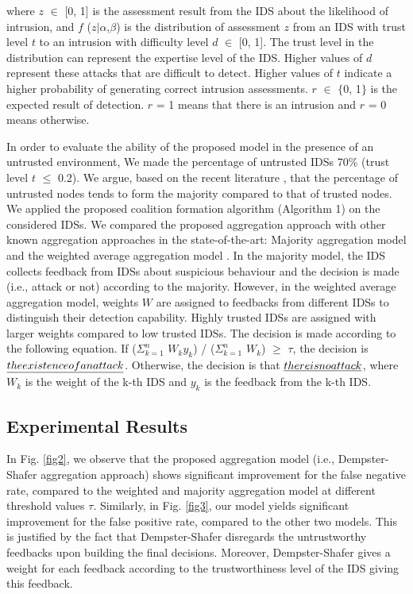 \documentclass[conference]{IEEEtran}
\begin{document}
where $z$ $\in$ [0, 1] is the assessment result from the IDS about the likelihood of intrusion, and $f$ ($z$$|$$\alpha$,$\beta$) is the distribution of assessment $z$ from an IDS with trust level $t$ to an intrusion with difficulty level $d$ $\in$ [0, 1]. The trust level in the distribution can represent the expertise level of the IDS. Higher values of $d$ represent these attacks that are difficult to detect. Higher values of $t$ indicate a higher probability of generating correct intrusion assessments. $r$ $\in$ $\{$0, 1$\}$ is the expected result of detection. $r$ = 1 means that there is an intrusion and $r$ = 0 means otherwise.

In order to evaluate the ability of the proposed model in the presence of an untrusted environment, We made the percentage of untrusted IDSs 70\% (trust level $t$ $\leq$ 0.2). We argue, based on the recent literature \cite{wahab2015survey}, that the percentage of untrusted nodes tends to form the majority compared to that of trusted nodes. We applied the proposed coalition formation algorithm (Algorithm 1) on the considered IDSs.  We compared the proposed aggregation approach with other known aggregation approaches in the state-of-the-art: Majority aggregation model \cite{lo2010cooperative} and the weighted average aggregation model \cite{fung2009robust}. In the majority model, the IDS collects feedback from IDSs about suspicious behaviour and the decision is made (i.e., attack or not) according to the majority. However, in the weighted average aggregation model, weights $W$ are assigned to feedbacks from different IDSs to distinguish their detection capability. Highly trusted IDSs are assigned with larger weights compared to low trusted IDSs. The decision is made according to the following equation. If ($\Sigma_{k=1}^{n}$ $W_{k}y_{k}$) / ($\Sigma_{k=1}^{n}$ $W_{k}$) $\geq$ $\tau$, the decision is $\emph{the existence of an attack}$. Otherwise, the decision is that $\emph{there is no attack}$, where $W_{k}$ is the weight of the k-th IDS and $y_{k}$ is the feedback from the k-th IDS.


\subsection{Experimental Results}

In Fig. \ref{fig2}, we observe that the proposed aggregation model (i.e., Dempster-Shafer aggregation approach) shows significant improvement for the false negative rate, compared to the weighted and majority aggregation model at different threshold values $\tau$. Similarly, in Fig. \ref{fig3}, our model yields significant improvement for the false positive rate, compared to the other two models. This is justified by the fact that Dempster-Shafer disregards the untrustworthy feedbacks upon building the final decisions. Moreover, Dempster-Shafer gives a weight for each feedback according to the trustworthiness level of the IDS giving this feedback.
\end{document}
